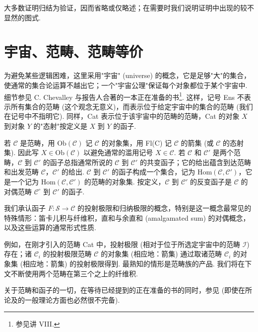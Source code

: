 大多数证明归结为验证，因而省略或仅略述；在需要时我们说明证明中出现的较不显然的图式.

\section{宇宙、范畴、范畴等价}

为避免某些逻辑困难，这里采用"宇宙" (universe) 的概念，它是足够"大"的集合，使通常的集合论运算不越出它；一个"宇宙公理"保证每个对象都位于某个宇宙中. 细节参见 C. Chevalley 与报告人合著的一本正在准备的书\footnote{参见讲 VIII.}. 这样，记号 Ens 不表示所有集合的范畴 (这个观念无意义)，而表示位于给定宇宙中的集合的范畴 (我们在记号中不指明它). 同样，Cat 表示位于该宇宙中的范畴的范畴，Cat 的对象 $X$ 到对象 $Y$ 的"态射"按定义是 $X$ 到 $Y$ 的函子.

若 $\mathcal{C}$ 是范畴，用 $\mathrm{Ob}(\mathcal{C})$ 记 $\mathcal{C}$ 的对象集，用 Fl(C) 记 $\mathcal{C}$ 的箭集 (或 $\mathcal{C}$ 的态射集). 因此写 $X \in \mathrm{Ob}(\mathcal{C})$ 以避免通常的滥用记号 $X \in \mathcal{C}$. 若 $\mathcal{C}$ 和 $\mathcal{C}'$ 是两个范畴，$\mathcal{C}$ 到 $\mathcal{C}'$ 的函子总指通常所说的 $\mathcal{C}$ 到 $\mathcal{C}'$ 的共变函子；它的给出蕴含到达范畴和出发范畴 $\mathcal{C}$，$\mathcal{C}'$ 的给出. $\mathcal{C}$ 到 $\mathcal{C}'$ 的函子构成一个集合，记为 Hom$(\mathcal{C}, \mathcal{C}')$，它是一个记为 Hom$(\mathcal{C}, \mathcal{C}')$ 的范畴的对象集. 按定义，$\mathcal{C}$ 到 $\mathcal{C}'$ 的反变函子是 $\mathcal{C}$ 的对偶范畴 $\mathcal{C}^{\circ}$ 到 $\mathcal{C}'$ 的函子.

我们承认函子 $F \colon \mathcal{S} \to \mathcal{C}$ 的投射极限和归纳极限的概念，特别是这一概念最常见的特殊情形：笛卡儿积与纤维积，直和与余直和 (amalgamated sum) 的对偶概念，以及这些运算的通常形式性质.

例如，在刚才引入的范畴 Cat 中，投射极限 (相对于位于所选定宇宙中的范畴 $\mathcal{I}$) 存在；诸 $\mathcal{C}_i$ 的投射极限范畴 $\mathcal{C}$ 的对象集 (相应地：箭集) 通过取诸范畴 $\mathcal{C}_i$ 的对象集 (相应地：箭集) 的投射极限得到. 最熟知的情形是范畴族的产品. 我们将在下文不断使用两个范畴在第三个之上的纤维积.

关于范畴和函子的一切，在等待已经提到的正在准备的书的同时，参见 \cite{exp06-1} (即使在所论及的一般理论方面也必然很不完备).

